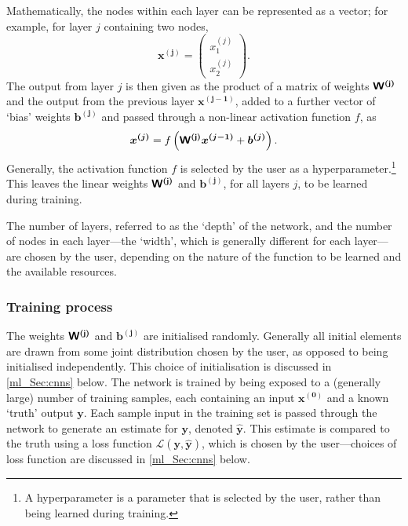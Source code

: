 Mathematically, the nodes within each layer can be represented as a vector; for example, for layer $j$ containing two nodes,
\begin{equation}
\bm{x^{(j)}} =
\begin{pmatrix}
x^{(j)}_1 \\
x^{(j)}_2
\end{pmatrix}.
\end{equation}
The output from layer $j$ is then given as the product of a matrix of weights $\bm{\mathsf{W^{(j)}}}$ and the output from the previous layer $\bm{x^{(j - 1)}}$, added to a further vector of `bias' weights $\bm{b^{(j)}}$ and passed through a non-linear activation function $f$, as
\begin{equation}
\bm{x^{(j)}} = f \left( \bm{\mathsf{W^{(j)}}}
\bm{x^{(j - 1)}} + \bm{b^{(j)}} \right).
\label{ml_Eqn:nn_linear}
\end{equation}
Generally, the activation function $f$ is selected by the user as a hyperparameter.\footnote{A hyperparameter is a parameter that is selected by the user, rather than being learned during training.} This leaves the linear weights $\bm{\mathsf{W^{(j)}}}$ and $\bm{b^{(j)}}$, for all layers $j$, to be learned during training.

The number of layers, referred to as the `depth' of the network, and the number of nodes in each layer---the `width', which is generally different for each layer---are chosen by the user, depending on the nature of the function to be learned and the available resources.

\subsubsection{Training process}

The weights $\bm{\mathsf{W^{(j)}}}$ and $\bm{b^{(j)}}$ are initialised randomly. Generally all initial elements are drawn from some joint distribution chosen by the user, as opposed to being initialised independently. This choice of initialisation is discussed in \autoref{ml_Sec:cnns} below. The network is trained by being exposed to a (generally large) number of training samples, each containing an input $\bm{x^{(0)}}$ and a known `truth' output $\bm{y}$. Each sample input in the training set is passed through the network to generate an estimate for $\bm{y}$, denoted $\bm{\widehat{y}}$. This estimate is compared to the truth using a loss function $\mathcal{L}\left( \bm{y}, \bm{\widehat{y}} \right)$, which is chosen by the user---choices of loss function are discussed in \autoref{ml_Sec:cnns} below.

